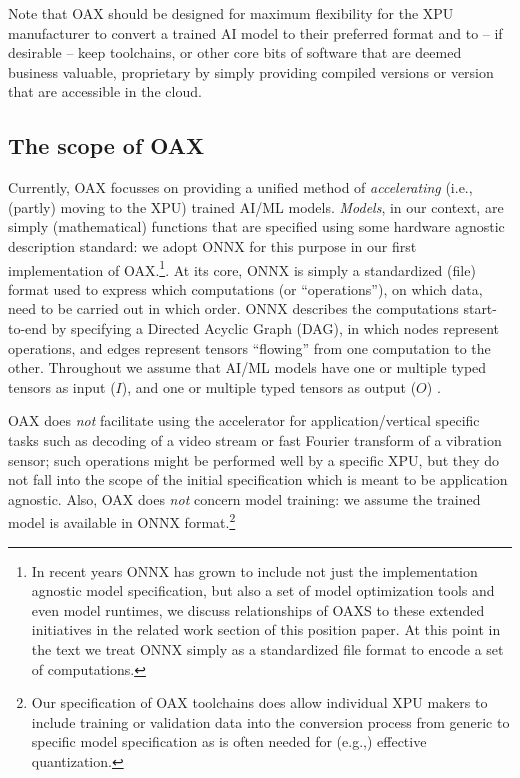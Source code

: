 \documentclass{article}
\begin{document}
Note that OAX should be designed for maximum flexibility for the XPU manufacturer to convert a trained AI model to their preferred format and to -- if desirable -- keep toolchains, or other core bits of software that are deemed business valuable, proprietary by simply providing compiled versions or version that are accessible in the cloud.

\subsection{The scope of OAX}

Currently, OAX focusses on providing a unified method of \emph{accelerating} (i.e., (partly) moving to the XPU) trained AI/ML models. \emph{Models}, in our context, are simply (mathematical) functions that are specified using some hardware agnostic description standard: we adopt ONNX \cite{ONNX} for this purpose in our first implementation of OAX.\footnote{In recent years ONNX has grown to include not just the implementation agnostic model specification, but also a set of model optimization tools and even model runtimes, we discuss relationships of OAXS to these extended initiatives in the related work section of this position paper. At this point in the text we treat ONNX simply as a standardized file format to encode a set of computations.}. At its core, ONNX is simply a standardized (file) format used to express which computations (or ``operations''), on which data, need to be carried out in which order. ONNX describes the computations start-to-end by specifying a Directed Acyclic Graph (DAG), in which nodes represent operations, and edges represent tensors ``flowing'' from one computation to the other. Throughout we assume that AI/ML models have one or multiple typed tensors as input ($I$), and  one or multiple typed tensors as output ($O$) . 

OAX does \emph{not} facilitate using the accelerator for application/vertical specific tasks such as decoding of a video stream or fast Fourier transform of a vibration sensor; such operations might be performed well by a specific XPU, but they do not fall into the scope of the initial  specification which is meant to be application agnostic. Also, OAX does \emph{not} concern model training: we assume the trained model is available in ONNX format.\footnote{Our specification of OAX toolchains does allow individual XPU makers to include training or validation data into the conversion process from generic to specific model specification as is often needed for (e.g.,) effective quantization.}
\end{document}
